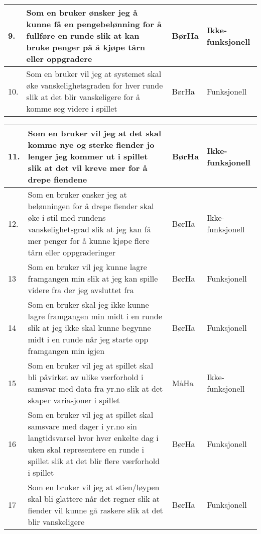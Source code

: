 \documentclass[norsk,a4paper]{article}
\begin{document}
\begin{center}
\begin{tabular}{ | m{0.4cm} | m{6.1cm} | m{2cm} | m{3cm} | }
    9. & Som en bruker ønsker jeg å kunne få en pengebelønning for å fullføre en runde slik at kan bruke penger på å kjøpe tårn eller oppgradere & BørHa & Ikke-funksjonell \\ \hline
     
    10. & Som en bruker vil jeg at systemet skal øke vanskelighetsgraden for hver runde slik at det blir vanskeligere for å komme seg videre i spillet & BørHa & Funksjonell \\ \hline
   
    
    
\end{tabular}

\begin{tabular}{|m{} | m{} | m{2cm} | m{3cm} |}
    \hline   
    
   	   11. & Som en bruker vil jeg at det skal komme nye og sterke fiender jo lenger jeg kommer ut i spillet slik at det vil kreve mer for å drepe fiendene & BørHa & Ikke-funksjonell
    \\ \hline
     
    12. & Som en bruker ønsker jeg at belønningen for å drepe fiender skal øke i stil med rundens vanskelighetsgrad slik at jeg kan få mer penger for å kunne kjøpe flere tårn eller oppgraderinger & BørHa & Ikke-funksjonell \\
    \hline
    
    13 & Som en bruker vil jeg kunne lagre framgangen min slik at jeg kan spille videre fra der jeg avsluttet fra & BørHa & Funksjonell \\ \hline
      
    14 & Som en bruker skal jeg ikke kunne lagre framgangen min midt i en runde slik at jeg ikke skal kunne begynne midt i en runde når jeg starte opp framgangen min igjen  & BørHa & Funksjonell \\ \hline
   
    15 & Som en bruker vil jeg at spillet skal bli påvirket av ulike værforhold i samsvar med data fra yr.no slik at det skaper variasjoner i spillet  & MåHa & Ikke-funksjonell \\ \hline
    
    16 & Som en bruker vil jeg at spillet skal samsvare med dager i yr.no sin langtidsvarsel hvor hver enkelte dag i uken skal representere en runde i spillet slik at det blir flere værforhold i spillet & BørHa & Funksjonell \\ \hline
    
    17 & Som en bruker vil jeg at stien/løypen skal bli glattere når det regner slik at fiender vil kunne gå raskere slik at det blir vanskeligere & BørHa & Funksjonell \\ \hline
    

\end{tabular}
\end{center}
\end{document}
